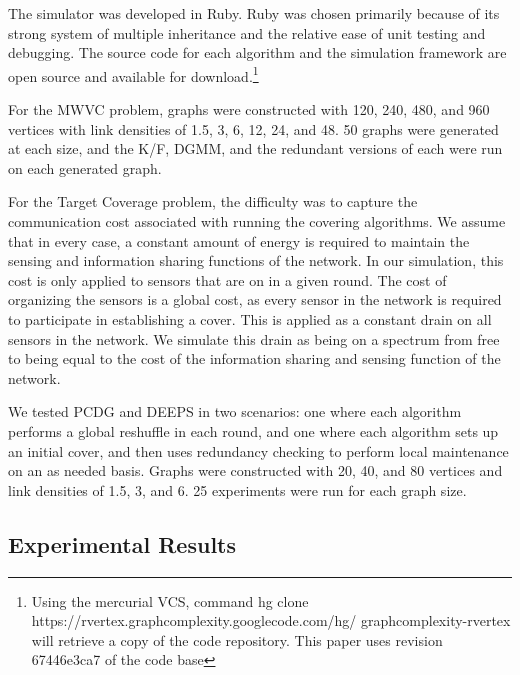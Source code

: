 The simulator was developed in Ruby. Ruby was chosen primarily because of its strong system of multiple inheritance and the relative ease of unit testing and debugging. The source code for each algorithm and the simulation framework are open source and available for download.\footnote{Using the mercurial VCS, command hg clone https://rvertex.graphcomplexity.googlecode.com/hg/ graphcomplexity-rvertex will retrieve a copy of the code repository. This paper uses revision 67446e3ca7 of the code base} 

For the MWVC problem, graphs were constructed with 120, 240, 480, and 960 vertices with link densities of 1.5, 3, 6, 12, 24, and 48. 50 graphs were generated at each size, and the K/F, DGMM, and the redundant versions of each were run on each generated graph.

For the Target Coverage problem, the difficulty was to capture the communication cost associated with running the covering algorithms. We assume that in every case, a constant amount of energy is required to maintain the sensing and information sharing functions of the network. In our simulation, this cost is only applied to sensors that are on in a given round. The cost of organizing the sensors is a global cost, as every sensor in the network is required to participate in establishing a cover. This is applied as a constant drain on all sensors in the network. We simulate this drain as being on a spectrum from free to being equal to the cost of the information sharing and sensing function of the network. 

We tested PCDG and DEEPS in two scenarios: one where each algorithm performs a global reshuffle in each round, and one where each algorithm sets up an initial cover, and then uses redundancy checking to perform local maintenance on an as needed basis. Graphs were constructed with 20, 40, and 80 vertices and link densities of 1.5, 3, and 6. 25 experiments were run for each graph size.
 
\subsection{Experimental Results}
\label{sub:exp-results}
